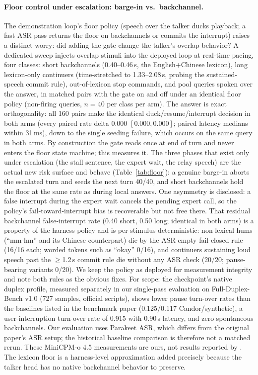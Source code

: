 \paragraph{Floor control under escalation: barge-in vs.\ backchannel.}
The demonstration loop's floor policy (speech over the talker ducks
playback; a fast ASR pass returns the floor on backchannels or commits
the interrupt) raises a distinct worry: did adding the gate change the
talker's overlap behavior? A dedicated sweep injects overlap stimuli
into the deployed loop at real-time pacing, four classes: short
backchannels (0.40--0.46\,s, the English+Chinese lexicon), long
lexicon-only continuers (time-stretched to 1.33--2.08\,s, probing the
sustained-speech commit rule), out-of-lexicon stop commands, and pool
queries spoken over the answer, in matched pairs with the gate on
and off under an identical floor policy (non-firing queries, $n{=}40$
per class per arm). The answer is exact orthogonality: all 160 pairs
make the identical duck/resume/interrupt decision in both arms (every
paired rate delta $0.000$ $[0.000,0.000]$; paired latency medians
within 31\,ms), down to the single seeding failure, which occurs on
the same query in both arms. By construction the gate reads once at
end of turn and never enters the floor state machine; this measures
it. The three phases that exist only under escalation (the stall
sentence, the expert wait, the relay speech) are the actual new
risk surface and behave (Table~\ref{tab:floor}): a genuine barge-in
aborts the escalated turn and seeds the next turn 40/40, and short
backchannels hold the floor at the same rate as during local answers.
One asymmetry is disclosed: a false interrupt during the expert wait
cancels the pending expert call, so the policy's fail-toward-interrupt
bias is recoverable but not free there. That residual backchannel
false-interrupt rate (0.40 short, 0.50 long; identical in both arms)
is a property of the harness policy and is per-stimulus deterministic:
non-lexical hums (``mm-hm'' and its Chinese counterpart) die by the
ASR-empty fail-closed rule (16/16 each; worded tokens such as
``okay'' 0/16), and continuers sustaining loud speech past the
$\ge$1.2\,s commit rule die without any ASR check (20/20;
pause-bearing variants 0/20). We keep the policy as deployed for
measurement integrity and note both rules as the obvious fixes. For
scope: the checkpoint's native duplex profile, measured
separately in our single-pass evaluation on Full-Duplex-Bench v1.0
\citep{lin2025fdb} (727 samples, official scripts), shows lower pause
turn-over rates than the baselines listed in the benchmark paper
(0.125/0.117 Candor/synthetic), a user-interruption turn-over rate of
0.915 with 0.90\,s latency, and zero spontaneous backchannels. Our evaluation uses
Parakeet ASR, which differs from the original paper's ASR setup;
the historical baseline comparison is therefore not a matched rerun.
These MiniCPM-o 4.5 measurements are ours, not results reported by
\citet{lin2025fdb}. The
lexicon floor is a harness-level approximation added precisely because
the talker head has no native backchannel behavior to preserve.


